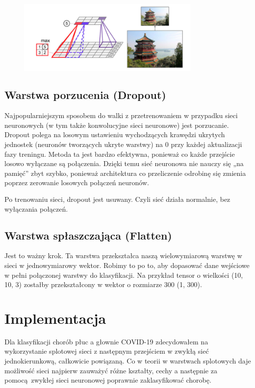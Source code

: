 \documentclass{article}
\begin{document}
\begin{figure}[H]
	\centering
	\includegraphics[width=0.8\textwidth,keepaspectratio=true]{max_pooling}
	\caption{}
	\label{max_pooling}
\end{figure}


\subsection{Warstwa porzucenia (Dropout)}
Najpopularniejszym sposobem do walki z przetrenowaniem w przypadku sieci neuronowych (w tym także konwolucyjne sieci neuronowe) jest porzucanie. Dropout polega na losowym ustawieniu wychodzących krawędzi ukrytych jednostek (neuronów tworzących ukryte warstwy) na 0 przy każdej aktualizacji fazy treningu. Metoda ta jest bardzo efektywna, ponieważ co każde przejście losowo wyłączane są połączenia. Dzięki temu sieć neuronowa nie nauczy się „na pamięć” zbyt szybko, ponieważ architektura co przeliczenie odrobinę się zmienia poprzez zerowanie losowych połączeń neuronów. \cite{jak_dziawaja_cnn}

Po trenowaniu sieci, dropout jest usuwany. Czyli sieć działa normalnie, bez wyłączania połączeń.


\subsection{Warstwa spłaszczająca (Flatten)}
Jest to ważny krok. Ta warstwa przekształca naszą wielowymiarową warstwę w sieci w jednowymiarowy wektor. Robimy to po to, aby dopasować dane wejściowe w pełni połączonej warstwy do klasyfikacji. Na przykład tensor o wielkości (10, 10, 3) zostałby przekształcony w wektor o rozmiarze 300 (1, 300). \cite{jak_dziawaja_cnn}

\section{Implementacja}
Dla klasyfikacji chorób płuc a głownie COVID-19 zdecydowałem na wykorzystanie splotowej sieci z następnym przejściem w zwykłą sieć jednokierunkową, całkowicie powiązaną. Co w teorii w warstwach splotowych daje możliwość sieci najpierw zauważyć różne kształty, cechy a następnie za pomocą zwykłej sieci neuronowej poprawnie zaklasyfikować chorobę.
\end{document}
